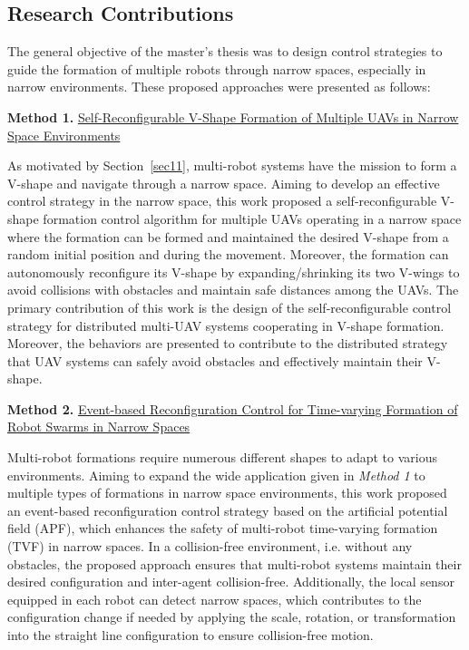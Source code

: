 \subsection{Research Contributions}
The general objective of the master's thesis was to design control strategies to guide the formation of multiple robots through narrow spaces, especially in narrow environments. These proposed approaches were presented as follows:

\noindent \textbf{Method 1.} \hyperref[paper1]{Self-Reconfigurable V-Shape Formation of Multiple UAVs in Narrow Space Environments}

As motivated by Section~\ref{sec11}, multi-robot systems have the mission to form a V-shape and navigate through a narrow space. Aiming to develop an effective control strategy in the narrow space, this work proposed a self-reconfigurable V-shape formation control algorithm for multiple UAVs operating in a narrow space where the formation can be formed and maintained the desired V-shape from a random initial position and during the movement. Moreover, the formation can autonomously reconfigure its V-shape by expanding/shrinking its two V-wings to avoid collisions with obstacles and maintain safe distances among the UAVs. The primary contribution of this work is the design of the self-reconfigurable control strategy for distributed multi-UAV systems cooperating in V-shape formation. Moreover, the behaviors are presented to contribute to the distributed strategy that UAV systems can safely avoid obstacles and effectively maintain their V-shape.

\noindent \textbf{Method 2.} \hyperref[paper2]{Event-based Reconfiguration Control for Time-varying Formation of Robot Swarms in Narrow Spaces}

Multi-robot formations require numerous different shapes to adapt to various environments. Aiming to expand the wide application given in \textit{Method 1} to multiple types of formations in narrow space environments, this work proposed an event-based reconfiguration control strategy based on the artificial potential field (APF), which enhances the safety of multi-robot time-varying formation (TVF) in narrow spaces. In a collision-free environment, i.e. without any obstacles, the proposed approach ensures that multi-robot systems maintain their desired configuration and inter-agent collision-free. Additionally, the local sensor equipped in each robot can detect narrow spaces, which contributes to the configuration change if needed by applying the scale, rotation, or transformation into the straight line configuration to ensure collision-free motion.

